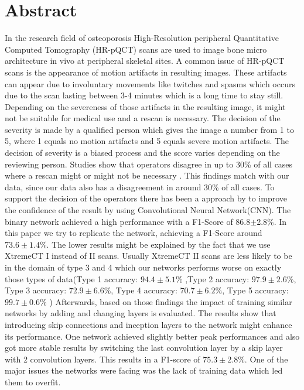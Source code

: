 \documentclass[
a4paper, 
12pt,
grayscalebody, %
abstract=on,
twoside, BCOR10mm, 12pt, DIV13,headinclude, footexclude, final, abstracton, openright
]{ibireprt}
\numberwithin{equation}{chapter}
\numberwithin{table}{chapter}
\numberwithin{figure}{chapter}
\numberwithin{algorithm}{chapter}
\numberwithin{example}{chapter}
\numberwithin{example}{chapter}
\begin{document}
\chapter*{Abstract}
In the research field of osteoporosis High-Resolution peripheral Quantitative Computed Tomography (HR-pQCT) scans are used to image bone micro architecture in vivo at peripheral skeletal sites. A common issue of HR-pQCT scans is the appearance of motion artifacts in resulting images. These artifacts can appear due to involuntary movements like twitches and spasms which occurs due to the scan lasting between 3-4 minutes which is a long time to stay still. Depending on the severeness of those artifacts in the resulting image, it might not be suitable for medical use and a rescan is necessary. The decision of the severity is made by a qualified person which gives the image a number from 1 to 5, where 1 equals no motion artifacts and 5 equals severe motion artifacts. The decision of severity is a biased process and the score varies depending on the reviewing person. Studies show that operators disagree in up to 30\% of all cases where a rescan might or might not be necessary \cite{Walle2023}. This findings match with our data, since our data also has a disagreement in around 30\% of all cases. To support the decision of the operators there has been a approach by \cite{Walle2023} to improve the confidence of the result by using Convolutional Neural Network(CNN). The binary network achieved a high performance with a F1-Score of 86.8$\pm$2.8\%. In this paper we try to replicate the network, achieving a F1-Score around $73.6\pm1.4\%$.
The lower results might be explained by the fact that we use XtremeCT I instead of II scans. Usually XtremeCT II scans are less likely to be in the domain of type 3 and 4 which our networks performs worse on exactly those types of data(Type 1 accuracy: $94.4\pm5.1\%$ ,Type 2 accuracy: $97.9\pm2.6\%$, Type 3 accuracy: $72.9\pm6.6\%$, Type 4 accuracy: $70.7\pm6.2\%$, Type 5 accuracy: $99.7\pm0.6\%$ ) Afterwards, based on those findings the impact of training similar networks by adding and changing layers is evaluated. The results show that introducing skip connections and inception layers to the network might enhance its performance. One network achieved slightly better peak performances and also got more stable results by switching the last convolution layer by a skip layer with 2 convolution layers. This results in a F1-score of $75.3\pm2.8\%$. One of the major issues the networks were facing was the lack of training data which led them to overfit. 
\end{document}
